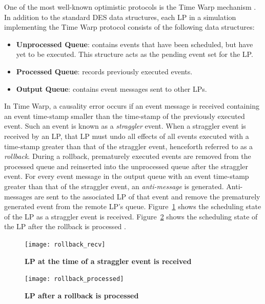 \documentclass[11pt]{book}
\begin{document}
One of the most well-known optimistic protocols is the Time Warp mechanism
\cite{fujimoto}.  In addition to the standard DES data structures, each LP in a simulation
implementing the Time Warp protocol consists of the following data structures:

\vspace*{-\bigskipamount}
\begin{singlespace}
\begin{itemize}
  \item \textbf{Unprocessed Queue}: contains events that have been scheduled, but have yet
    to be executed.  This structure acts as the pending event set for the LP.
  \item\textbf{Processed Queue}: records previously executed events.
  \item\textbf{Output Queue}: contains event messages sent to other LPs.
\end{itemize}
\end{singlespace}

In Time Warp, a causality error occurs if an event message is received containing an event
time-stamp smaller than the time-stamp of the previously executed event.  Such an event is
known as a \emph{straggler} event.  When a straggler event is received by an LP, that LP
must undo all effects of all events executed with a time-stamp greater than that of the
straggler event, henceforth referred to as a \emph{rollback}.  During a rollback,
prematurely executed events are removed from the processed queue and reinserted into the
unprocessed queue after the straggler event.  For every event message in the output queue
with an event time-stamp greater than that of the straggler event, an \emph{anti-message}
is generated.  Anti-messages are sent to the associated LP of that event and remove the
prematurely generated event from the remote LP's queue.
Figure~\ref{fig:rollback_stragglerrecvd} shows the scheduling state of the LP as a
straggler event is received.  Figure~\ref{fig:rollback_processed} shows the scheduling
state of the LP after the rollback is processed \cite{dickman}.

\begin{figure}
    \centering
    \graphicspath{ {./figures/} }
    \texttt{[image: rollback\_recv]}
    \caption{\textbf{LP at the time of a straggler event is
        received}}\label{fig:rollback_stragglerrecvd}
\end{figure}

\begin{figure}
    \centering
    \graphicspath{ {./figures/} }
    \texttt{[image: rollback\_processed]}
    \caption{\textbf{LP after a rollback is processed}}\label{fig:rollback_processed}
\end{figure}
\end{document}
